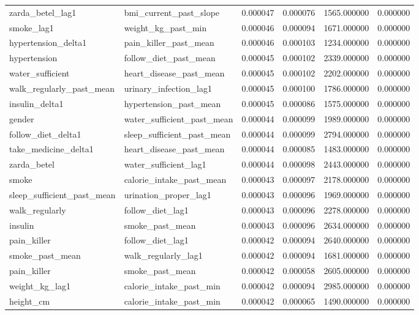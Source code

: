 \begin{longtable}{llrrrr}
zarda\_betel\_lag1 & bmi\_current\_past\_slope & 0.000047 & 0.000076 & 1565.000000 & 0.000000 \\
smoke\_lag1 & weight\_kg\_past\_min & 0.000046 & 0.000094 & 1671.000000 & 0.000000 \\
hypertension\_delta1 & pain\_killer\_past\_mean & 0.000046 & 0.000103 & 1234.000000 & 0.000000 \\
hypertension & follow\_diet\_past\_mean & 0.000045 & 0.000102 & 2339.000000 & 0.000000 \\
water\_sufficient & heart\_disease\_past\_mean & 0.000045 & 0.000102 & 2202.000000 & 0.000000 \\
walk\_regularly\_past\_mean & urinary\_infection\_lag1 & 0.000045 & 0.000100 & 1786.000000 & 0.000000 \\
insulin\_delta1 & hypertension\_past\_mean & 0.000045 & 0.000086 & 1575.000000 & 0.000000 \\
gender & water\_sufficient\_past\_mean & 0.000044 & 0.000099 & 1989.000000 & 0.000000 \\
follow\_diet\_delta1 & sleep\_sufficient\_past\_mean & 0.000044 & 0.000099 & 2794.000000 & 0.000000 \\
take\_medicine\_delta1 & heart\_disease\_past\_mean & 0.000044 & 0.000085 & 1483.000000 & 0.000000 \\
zarda\_betel & water\_sufficient\_lag1 & 0.000044 & 0.000098 & 2443.000000 & 0.000000 \\
smoke & calorie\_intake\_past\_mean & 0.000043 & 0.000097 & 2178.000000 & 0.000000 \\
sleep\_sufficient\_past\_mean & urination\_proper\_lag1 & 0.000043 & 0.000096 & 1969.000000 & 0.000000 \\
walk\_regularly & follow\_diet\_lag1 & 0.000043 & 0.000096 & 2278.000000 & 0.000000 \\
insulin & smoke\_past\_mean & 0.000043 & 0.000096 & 2634.000000 & 0.000000 \\
pain\_killer & follow\_diet\_lag1 & 0.000042 & 0.000094 & 2640.000000 & 0.000000 \\
smoke\_past\_mean & walk\_regularly\_lag1 & 0.000042 & 0.000094 & 1681.000000 & 0.000000 \\
pain\_killer & smoke\_past\_mean & 0.000042 & 0.000058 & 2605.000000 & 0.000000 \\
weight\_kg\_lag1 & calorie\_intake\_past\_min & 0.000042 & 0.000094 & 2985.000000 & 0.000000 \\
height\_cm & calorie\_intake\_past\_min & 0.000042 & 0.000065 & 1490.000000 & 0.000000 \\

\end{longtable}
